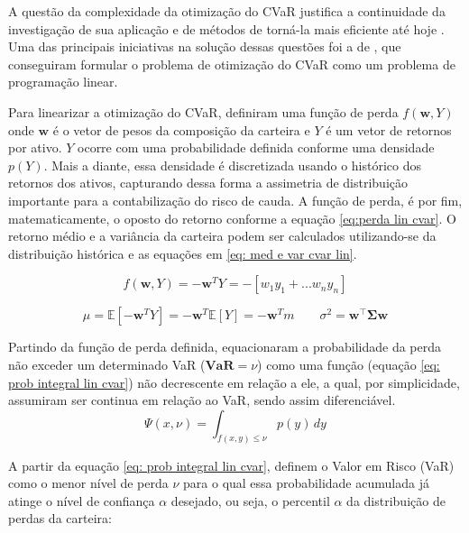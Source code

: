 \documentclass[12pt,a4paper]{article}
\begin{document}
A questão da complexidade da otimização do CVaR justifica a continuidade da investigação de sua aplicação e de métodos de torná-la mais eficiente até hoje \cite{barrosa2015aplicacao}. Uma das principais iniciativas na solução dessas questões foi a de , que conseguiram formular o problema de otimização do CVaR como um problema de programação linear. 

Para linearizar a otimização do CVaR,  definiram uma função de perda $f(\mathbf{w}, Y)$ onde $\mathbf{w}$ é o vetor de pesos da composição da carteira e $Y$ é um vetor de retornos por ativo. $Y$ ocorre com uma probabilidade definida conforme uma densidade $p(Y)$. Mais a diante, essa densidade é discretizada usando o histórico dos retornos dos ativos, capturando dessa forma a assimetria de distribuição importante para a contabilização do risco de cauda. A função de perda, é por fim, matematicamente, o oposto do retorno conforme a equação \ref{eq:perda lin cvar}. O retorno médio e a variância da carteira podem ser calculados utilizando-se da distribuição histórica e as equações em \ref{eq: med e var cvar lin}.

\begin{equation}
f(\mathbf{w}, Y) = - \mathbf{w}^TY = - [w_1y_1 +... w_ny_n]
\label{eq:perda lin cvar}
\end{equation}

\begin{equation}
 \mu=\mathbb{E}[- \mathbf{w}^TY] = - \mathbf{w}^T\mathbb{E}[Y] =- \mathbf{w}^Tm
\qquad \sigma^2 =\mathbf{w}^\top \boldsymbol{\Sigma} \mathbf{w}
\label{eq: med e var cvar lin}
\end{equation}

Partindo da função de perda definida,  equacionaram a probabilidade da perda não exceder um determinado VaR ($\mathbf{VaR}=\nu$) como uma função (equação \ref{eq: prob integral lin cvar}) não decrescente em relação a ele, a qual, por simplicidade, assumiram ser continua em relação ao VaR, sendo assim diferenciável.
\begin{equation}
\Psi(x, \nu) = \int_{f(x,y) \le \nu} p(y) \, dy
\label{eq: prob integral lin cvar}
\end{equation}

A partir da equação \ref{eq: prob integral lin cvar},  definem o Valor em Risco (VaR) como o menor nível de perda $\nu$ para o qual essa probabilidade acumulada já atinge o nível de confiança $\alpha$ desejado, ou seja, o percentil $\alpha$ da distribuição de perdas da carteira:
\end{document}

